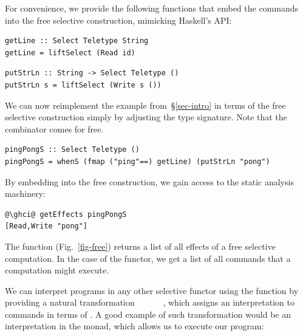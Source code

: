 \noindent
For convenience, we provide the following functions that embed the commands into
the free selective construction, mimicking Haskell's  API:

\vspace{1mm}
\begin{verbatim}
getLine :: Select Teletype String
getLine = liftSelect (Read id)
\end{verbatim}
\vspace{0mm}
\begin{verbatim}
putStrLn :: String -> Select Teletype ()
putStrLn s = liftSelect (Write s ())
\end{verbatim}
\vspace{1mm}

\noindent
We can now reimplement the  example from~\S\ref{sec-intro} in
terms of the free selective construction simply by adjusting the type signature.
Note that the  combinator comes for free.

\vspace{1mm}
\begin{verbatim}
pingPongS :: Select Teletype ()
pingPongS = whenS (fmap ("ping"==) getLine) (putStrLn "pong")
\end{verbatim}
\vspace{1mm}

\noindent
By embedding  into the free construction, we gain access to the
static analysis machinery:

\vspace{1mm}
\begin{verbatim}
@\ghci@ getEffects pingPongS
[Read,Write "pong"]
\end{verbatim}
\vspace{1mm}

\noindent
The  function (Fig.~\ref{fig-free}) returns a list of all effects
of a free selective computation. In the case of the  functor, we
get a list of all commands that a computation might execute.


We can interpret  programs in any other selective functor using
the  function by providing a natural transformation
~~~~\hs{->}~~, which assigns an
interpretation to  commands in terms of . A good example of
such transformation would be an interpretation in the  monad, which
allows us to execute our  program:

